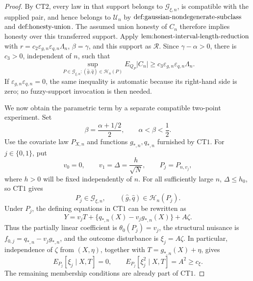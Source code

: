\documentclass{article}
\begin{document}
\begin{proof}
By \(\mathrm{CT2}\), every law in that support belongs to \(\mathcal G_{\xi,n}\), is compatible with the supplied pair, and hence belongs to \(\mathcal U_n\) by \(\textup{def:gaussian-nondegenerate-subclass}\) and \(\textup{def:honesty-union}\).  The assumed union honesty of \(C_n\) therefore implies honesty over this transferred support.  Apply \(\textup{lem:honest-interval-length-reduction}\) with \(r=c_2\varepsilon_{g,n}\varepsilon_{q,n}\Lambda_n\), \(\beta=\gamma\), and this support as \(\mathscr R\).  Since \(\gamma-\alpha>0\), there is \(c_3>0\), independent of \(n\), such that
\[
 \sup_{P\in\mathcal G_{\xi,n}:(\widehat g,\widehat q)\in\mathcal H_n(P)}
 E_{Q_P}|C_n|
 \ge c_3\varepsilon_{g,n}\varepsilon_{q,n}\Lambda_n.
\]
If \(\varepsilon_{g,n}\varepsilon_{q,n}=0\), the same inequality is automatic because its right-hand side is zero; no fuzzy-support invocation is then needed.

We now obtain the parametric term by a separate compatible two-point experiment.  Set
\[
 \beta=\frac{\alpha+1/2}{2},
 \qquad \alpha<\beta<\frac12.
\]
Use the covariate law \(P_{X,n}\) and functions \(g_{*,n},q_{*,n}\) furnished by \(\mathrm{CT1}\).  For \(j\in\{0,1\}\), put
\[
 v_0=0,
 \qquad
 v_1=\Delta=\frac{h}{\sqrt N},
 \qquad
 P_j=P_{n,v_j},
\]
where \(h>0\) will be fixed independently of \(n\).  For all sufficiently large \(n\), \(\Delta\le h_0\), so \(\mathrm{CT1}\) gives
\[
 P_j\in\mathcal G_{\xi,n},
 \qquad
 (\widehat g,\widehat q)\in\mathcal H_n(P_j).
\]
Under \(P_j\), the defining equations in \(\mathrm{CT1}\) can be rewritten as
\[
 Y=v_jT+\{q_{*,n}(X)-v_jg_{*,n}(X)\}+A\zeta.
\]
Thus the partially linear coefficient is \(\theta_0(P_j)=v_j\), the structural nuisance is \(f_{0,j}=q_{*,n}-v_jg_{*,n}\), and the outcome disturbance is \(\xi_j=A\zeta\).  In particular, independence of \(\zeta\) from \((X,\eta)\), together with \(T=g_{*,n}(X)+\eta\), gives
\[
 E_{P_j}[\xi_j\mid X,T]=0,
 \qquad
 E_{P_j}[\xi_j^2\mid X,T]=A^2\ge c_\xi.
\]
The remaining membership conditions are already part of \(\mathrm{CT1}\).


\end{proof}
\end{document}

